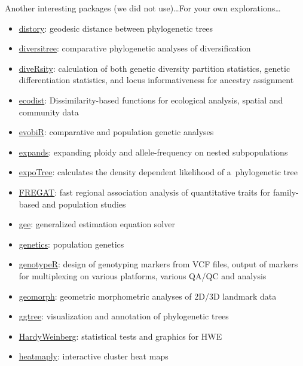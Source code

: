 \documentclass[compress, ucs, xelatex, 11pt, xcolor=svgnames,
  hyperref={
    bookmarks=true,
    unicode=true,
    colorlinks=true,
    pdftitle={Molecular data in R},
    plainpages=false,
    pdfauthor={Vojtech Zeisek},
    pdfsubject={Course about phylogeny and evolution in R},
    pdfcreator={XeLaTeX},
    pdfkeywords={R, evolution, phylogeny, molecular data},
    linkcolor=Tomato,
    anchorcolor=SaddleBrown,
    citecolor=Goldenrod,
    filecolor=DarkMagenta,
    menucolor=Sienna,
    urlcolor=DarkTurquoise,
    pdftex},
  url={hyphens, lowtilde} %
  ]{beamer}
\begin{document}
\begin{frame}[allowframebreaks]{Another interesting packages (we did not use)\ldots}{For your own explorations\ldots}
\begin{itemize}
    \item \href{https://CRAN.R-project.org/package=distory}{distory}: geodesic distance between phylogenetic trees
    \item \href{https://CRAN.R-project.org/package=diversitree}{diversitree}: comparative phylogenetic analyses of diversification
    \item \href{https://CRAN.R-project.org/package=diveRsity}{diveRsity}: calculation of both genetic diversity partition statistics, genetic differentiation statistics, and locus informativeness for ancestry assignment
    \item \href{https://CRAN.R-project.org/package=ecodist}{ecodist}: Dissimilarity-based functions for ecological analysis, spatial and community data
    \item \href{https://CRAN.R-project.org/package=evobiR}{evobiR}: comparative and population genetic analyses
    \item \href{https://CRAN.R-project.org/package=expands}{expands}: expanding ploidy and allele-frequency on nested subpopulations
    \item \href{https://CRAN.R-project.org/package=expoTree}{expoTree}: calculates the density dependent likelihood of a~phylogenetic tree
    \item \href{https://CRAN.R-project.org/package=FREGAT}{FREGAT}: fast regional association analysis of quantitative traits for family-based and population studies
    \item \href{https://CRAN.R-project.org/package=gee}{gee}: generalized estimation equation solver
    \item \href{https://CRAN.R-project.org/package=genetics}{genetics}: population genetics
    \item \href{https://CRAN.R-project.org/package=genotypeR}{genotypeR}: design of genotyping markers from VCF files, output of markers for multiplexing on various platforms, various QA/QC and analysis
    \item \href{https://CRAN.R-project.org/package=geomorph}{geomorph}: geometric morphometric analyses of 2D/3D landmark data
    \item \href{https://www.bioconductor.org/packages/3.4/bioc/html/ggtree.html}{ggtree}: visualization and annotation of phylogenetic trees
    \item \href{https://CRAN.R-project.org/package=HardyWeinberg}{HardyWeinberg}: statistical tests and graphics for HWE
    \item \href{https://CRAN.R-project.org/package=heatmaply}{heatmaply}: interactive cluster heat maps

\end{itemize}
\end{frame}
\end{document}
